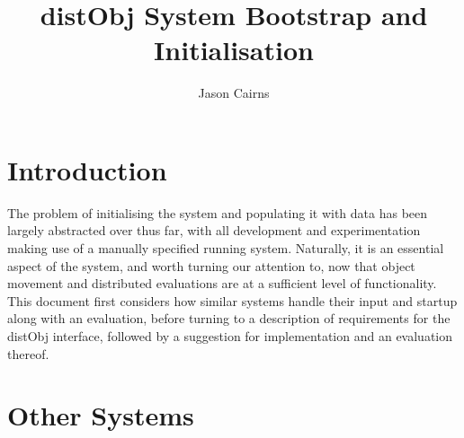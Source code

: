 \documentclass[a4paper,10pt]{article}
\begin{document}
\title{distObj System Bootstrap and Initialisation}
\author{Jason Cairns}
  
\maketitle{}

\section{Introduction}

The problem of initialising the system and populating it with data has been
largely abstracted over thus far, with all development and experimentation
making use of a manually specified running system.
Naturally, it is an essential aspect of the system, and worth turning our
attention to, now that object movement and distributed evaluations are at a
sufficient level of functionality.
This document first considers how similar systems handle their input and
startup along with an evaluation, before turning to a description of
requirements for the distObj interface, followed by a suggestion for
implementation and an evaluation thereof.


\section{Other Systems}
\end{document}
